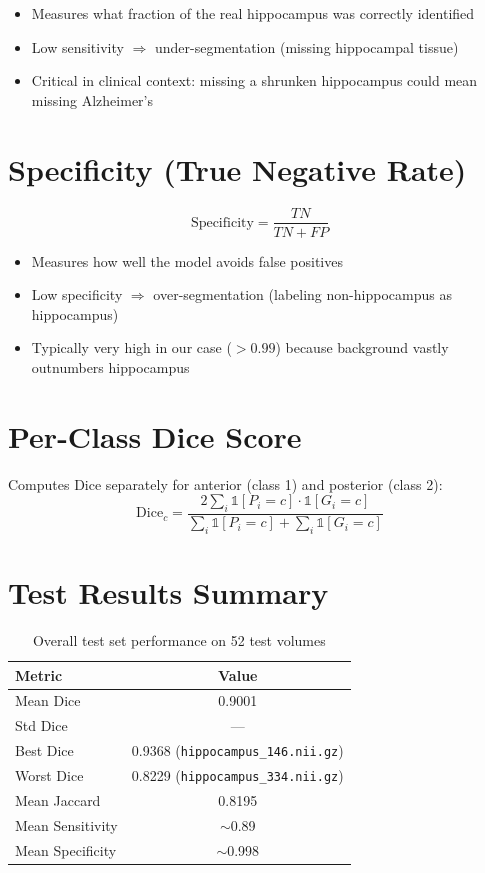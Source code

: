 \documentclass[12pt,a4paper]{report}
\begin{document}
\begin{itemize}
    \item Measures what fraction of the real hippocampus was correctly identified
    \item Low sensitivity $\Rightarrow$ under-segmentation (missing hippocampal tissue)
    \item Critical in clinical context: missing a shrunken hippocampus could mean missing Alzheimer's
\end{itemize}

\section{Specificity (True Negative Rate)}

$$\text{Specificity} = \frac{TN}{TN + FP}$$

\begin{itemize}
    \item Measures how well the model avoids false positives
    \item Low specificity $\Rightarrow$ over-segmentation (labeling non-hippocampus as hippocampus)
    \item Typically very high in our case ($>0.99$) because background vastly outnumbers hippocampus
\end{itemize}

\section{Per-Class Dice Score}

Computes Dice separately for anterior (class 1) and posterior (class 2):
$$\text{Dice}_{c} = \frac{2 \sum_i \mathbb{1}[P_i = c] \cdot \mathbb{1}[G_i = c]}{\sum_i \mathbb{1}[P_i = c] + \sum_i \mathbb{1}[G_i = c]}$$

\section{Test Results Summary}

\begin{table}[H]
\centering
\begin{tabular}{lc}
\toprule
\textbf{Metric} & \textbf{Value} \\
\midrule
Mean Dice & 0.9001 \\
Std Dice & --- \\
Best Dice & 0.9368 (\texttt{hippocampus\_146.nii.gz}) \\
Worst Dice & 0.8229 (\texttt{hippocampus\_334.nii.gz}) \\
Mean Jaccard & 0.8195 \\
Mean Sensitivity & $\sim$0.89 \\
Mean Specificity & $\sim$0.998 \\
\bottomrule
\end{tabular}
\caption{Overall test set performance on 52 test volumes}
\end{table}
\end{document}
